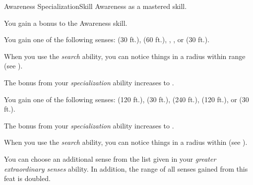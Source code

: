     \begin{feat}{Awareness Specialization}{Skill}
        \featpre Awareness as a mastered skill.

         You gain a  bonus to the Awareness skill.

         You gain one of the following senses:  (30 ft.),  (60 ft.), , , or  (30 ft.).

         When you use the \textit{search} ability, you can notice things in a \areasmall radius within \rngshort range (see ).

         The bonus from your \textit{specialization} ability increases to .

         You gain one of the following senses:  (120 ft.),  (30 ft.),  (240 ft.),  (120 ft.), or  (30 ft.).

         The bonus from your \textit{specialization} ability increases to .

         When you use the \textit{search} ability, you can notice things in a \medarea radius within \medrange (see ).

         You can choose an additional sense from the list given in your \textit{greater extraordinary senses} ability.
        In addition, the range of all senses gained from this feat is doubled.
    \end{feat}

